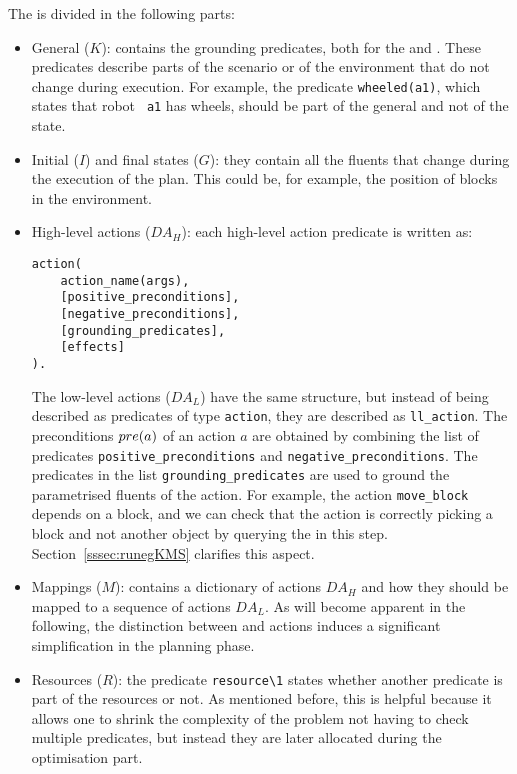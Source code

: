 The \kbase is divided in the following parts:
\begin{itemize}
    \item General \kb ($K$): contains the grounding predicates, both for the \HL and \LL. These predicates describe parts of the scenario or of the environment that do not change during execution. For example, the predicate \verb|wheeled(a1)|, which states that robot \verb | a1| has wheels, should be part of the general \kb and not of the state. 
    \item Initial ($I$) and final states ($G$): they contain all the fluents that change during the execution of the plan. This could be, for example, the position of blocks in the environment. 
    \item High-level actions ($DA_H$): each high-level action predicate is written as:
\begin{verbatim}
action(
    action_name(args),
    [positive_preconditions],
    [negative_preconditions],
    [grounding_predicates],
    [effects]
).
\end{verbatim}
    The low-level actions ($DA_L$) have the same structure, but instead of being described as predicates of type \verb|action|, they are described as \verb|ll_action|. The preconditions $pre(a)$ of an action $a$ are obtained by combining the list of predicates \verb|positive_preconditions| and \verb|negative_preconditions|. The predicates in the list \verb|grounding_predicates| are used to ground the parametrised fluents of the action. For example, the action \verb|move_block| depends on a block, and we can check that the action is correctly picking a block and not another object by querying the \kb in this step. Section~\ref{sssec:runegKMS} clarifies this aspect.  
    \item Mappings ($M$): contains a dictionary of \HL actions $DA_H$ and how they should be mapped to a sequence of \LL actions $DA_L$. As will become apparent in the following, the distinction between \HL and \LL actions induces a significant simplification in the planning phase.
    \item Resources ($R$): the predicate \verb|resource\1| states whether another predicate is part of the resources or not. As mentioned before, this is helpful because it allows one to shrink the complexity of the problem not having to check multiple predicates, but instead they are later allocated during the optimisation part.
\end{itemize}

